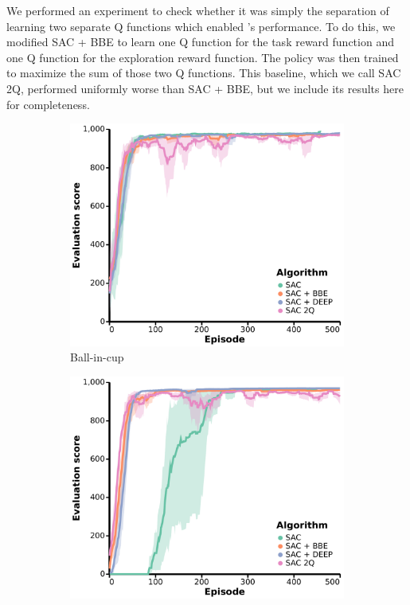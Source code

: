 {} \label{sec:benchmark_results_appendix}

We performed an experiment to check whether it was simply the separation of learning two separate Q functions which enabled \algshort{}'s performance.
To do this, we modified SAC + BBE to learn one Q function for the task reward function and one Q function for the exploration reward function.
The policy was then trained to maximize the sum of those two Q functions.
This baseline, which we call SAC 2Q, performed uniformly worse than SAC + BBE, but we include its results here for completeness.


\begin{figure}[h]
    \centering
    \begin{subfigure}[b]{0.24\textwidth}
        \centering
        \includegraphics[width=\textwidth]{figures/deep/neurips_SAC2Q_ball_in_cup.pdf}
        \caption{Ball-in-cup}
    \end{subfigure}
    \begin{subfigure}[b]{0.24\textwidth}
        \centering
        \includegraphics[width=\textwidth]{figures/deep/neurips_SAC2Q_ball_in_cup_explore.pdf}

\end{subfigure}
\end{figure}
